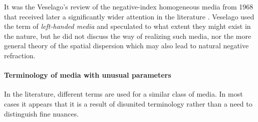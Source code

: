 It was the Veselago's review of the negative-index homogeneous media from 1968 that received later a significantly wider attention in the literature \cite{veselago1968}. Veselago used %
the term of \textit{left-handed media} and speculated to what extent they might exist in the nature, but he did not discuss the way of realizing such media, nor the more general theory of the spatial dispersion which may also lead to natural negative refraction.

\paragraph{Terminology of media with unusual parameters}  %
In the literature, different terms are used for a similar class of media. In most cases it appears \cite{lindell2001bw} that it is a result of disunited terminology rather than a need to distinguish fine nuances. 

